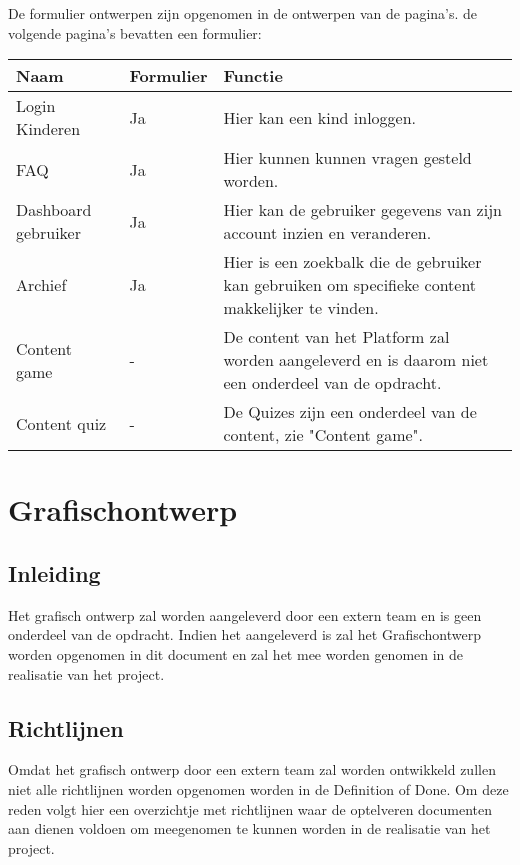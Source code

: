 \documentclass[]{report}
\begin{document}
De formulier ontwerpen zijn opgenomen in de ontwerpen van de pagina's.
de volgende pagina's bevatten een formulier: 

\begin{tabular}{ l l p{6cm} }
	\textbf{Naam} & \textbf{Formulier} & \textbf{Functie} \\ \hline
	Login Kinderen 		& Ja		& Hier kan een kind inloggen. \\
	FAQ 				& Ja 		& Hier kunnen kunnen vragen gesteld worden. \\
	Dashboard gebruiker	& Ja		& Hier kan de gebruiker gegevens van zijn account inzien en veranderen. \\
	Archief 			& Ja		& Hier is een zoekbalk die de gebruiker kan gebruiken om specifieke content makkelijker te vinden. \\
	Content game 		& - 		& De content van het Platform zal worden aangeleverd en is daarom niet een onderdeel van de opdracht. \\
	Content quiz 		& - 		& De Quizes zijn een onderdeel van de content, zie "Content game". \\
\end{tabular}






\chapter{Grafischontwerp}

\section{Inleiding}
Het grafisch ontwerp zal worden aangeleverd door een extern team en is geen onderdeel van de opdracht. Indien het aangeleverd is zal het Grafischontwerp worden opgenomen in dit document en zal het mee worden genomen in de realisatie van het project.

\section{Richtlijnen}
Omdat het grafisch ontwerp door een extern team zal worden ontwikkeld zullen niet alle richtlijnen worden opgenomen worden in de Definition of Done. Om deze reden volgt hier een overzichtje met richtlijnen waar de optelveren documenten aan dienen voldoen om meegenomen te kunnen worden in de realisatie van het project.

\vspace{5mm} %
\end{document}
